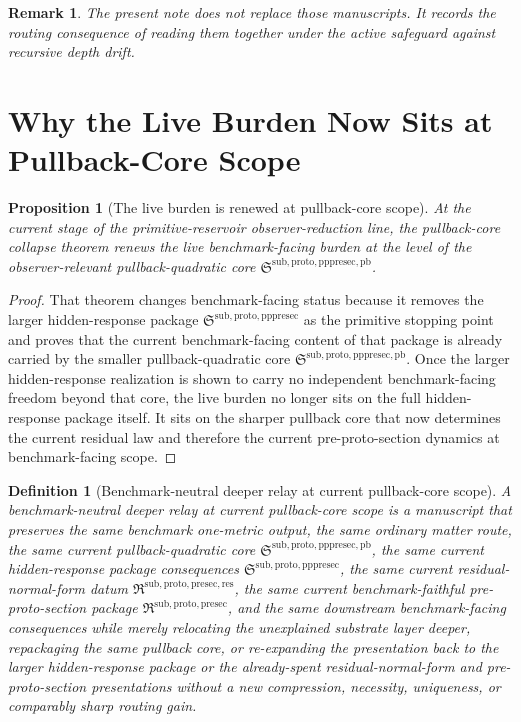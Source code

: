 \documentclass[11pt]{article}
\newcommand{\PreProtoSectionPackage}{\mathfrak R^{\mathrm{sub,proto,presec}}}
\newcommand{\PreProtoSectionResidualPackage}{\mathfrak R^{\mathrm{sub,proto,presec,res}}}
\newcommand{\PrePreProtoSectionPackage}{\mathfrak S^{\mathrm{sub,proto,pppresec}}}
\newcommand{\PrePreProtoSectionPullbackCore}{\mathfrak S^{\mathrm{sub,proto,pppresec,pb}}}
\newtheorem{definition}{Definition}
\newtheorem{proposition}{Proposition}
\newtheorem{remark}{Remark}
\begin{document}
\begin{remark}
The present note does not replace those manuscripts. It records the routing consequence of reading them together under the active safeguard against recursive depth drift.
\end{remark}

\section{Why the Live Burden Now Sits at Pullback-Core Scope}

\begin{proposition}[The live burden is renewed at pullback-core scope]
At the current stage of the primitive-reservoir observer-reduction line, the pullback-core collapse theorem renews the live benchmark-facing burden at the level of the observer-relevant pullback-quadratic core \(\PrePreProtoSectionPullbackCore\).
\end{proposition}

\begin{proof}
That theorem changes benchmark-facing status because it removes the larger hidden-response package \(\PrePreProtoSectionPackage\) as the primitive stopping point and proves that the current benchmark-facing content of that package is already carried by the smaller pullback-quadratic core \(\PrePreProtoSectionPullbackCore\). Once the larger hidden-response realization is shown to carry no independent benchmark-facing freedom beyond that core, the live burden no longer sits on the full hidden-response package itself. It sits on the sharper pullback core that now determines the current residual law and therefore the current pre-proto-section dynamics at benchmark-facing scope.
\end{proof}

\begin{definition}[Benchmark-neutral deeper relay at current pullback-core scope]
A \emph{benchmark-neutral deeper relay at current pullback-core scope} is a manuscript that preserves the same benchmark one-metric output, the same ordinary matter route, the same current pullback-quadratic core \(\PrePreProtoSectionPullbackCore\), the same current hidden-response package consequences \(\PrePreProtoSectionPackage\), the same current residual-normal-form datum \(\PreProtoSectionResidualPackage\), the same current benchmark-faithful pre-proto-section package \(\PreProtoSectionPackage\), and the same downstream benchmark-facing consequences while merely relocating the unexplained substrate layer deeper, repackaging the same pullback core, or re-expanding the presentation back to the larger hidden-response package or the already-spent residual-normal-form and pre-proto-section presentations without a new compression, necessity, uniqueness, or comparably sharp routing gain.
\end{definition}
\end{document}
